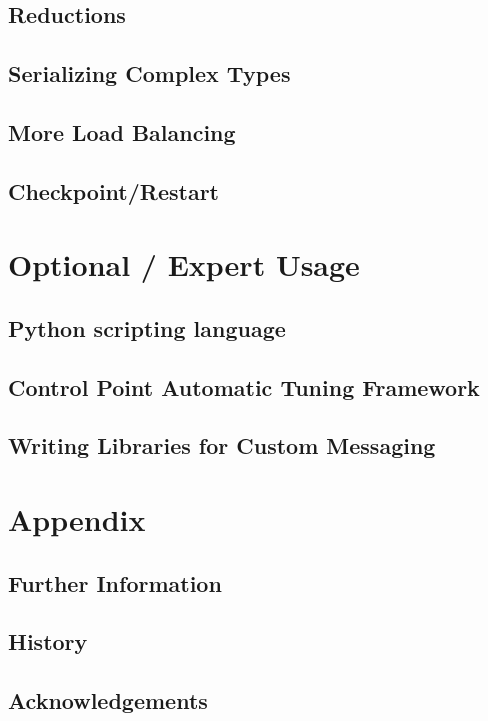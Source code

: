 \documentclass[10pt]{report}
\begin{document}
\chapter{Reductions}
  
  

\chapter{Serializing Complex Types}
  

\chapter{More Load Balancing}
  

\chapter{Checkpoint/Restart}
\label{sec:checkpoint}
  

      
%  


\part{Optional / Expert Usage}

\chapter{Python scripting language}
\label{python}
  

\chapter{Control Point Automatic Tuning Framework}
\label{sec:controlpoint}
  

\chapter{Writing Libraries for Custom Messaging}
  

%


\part{Appendix}
\appendix

%

\chapter{Further Information}
  

\chapter{History}
  

\chapter {Acknowledgements}
  


\end{document}
